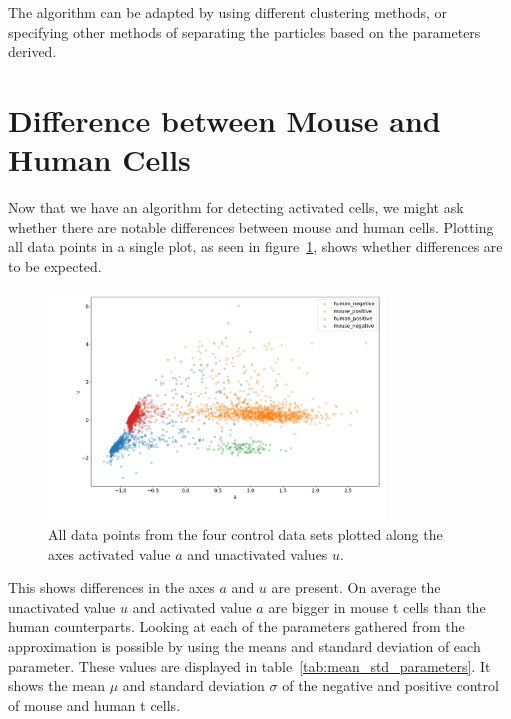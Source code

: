 The algorithm can be adapted by using different clustering methods, or specifying other methods of separating the particles based on the parameters derived.

\section{Difference between Mouse and Human Cells}
\label{sec:differences_between_mouse_and_human_cells}

Now that we have an algorithm for detecting activated cells, we might ask whether there are notable differences between mouse and human cells. Plotting all data points in a single plot, as seen in figure~\ref{fig:all_cells}, shows whether differences are to be expected.

\begin{figure}[h]
	\centering
	\includegraphics[width=0.8\textwidth]{fig/all_cells}
	
	\caption{All data points from the four control data sets plotted along the axes activated value $a$ and unactivated values $u$.}
	\label{fig:all_cells}
\end{figure}

This shows differences in the axes $a$ and $u$ are present. On average the unactivated value $u$ and activated value $a$ are bigger in mouse t cells than the human counterparts. Looking at each of the parameters gathered from the approximation is possible by using the means and standard deviation of each parameter. These values are displayed in table~\ref{tab:mean_std_parameters}. It shows the mean $\mu$ and standard deviation $\sigma$ of the negative and positive control of mouse and human t cells.

